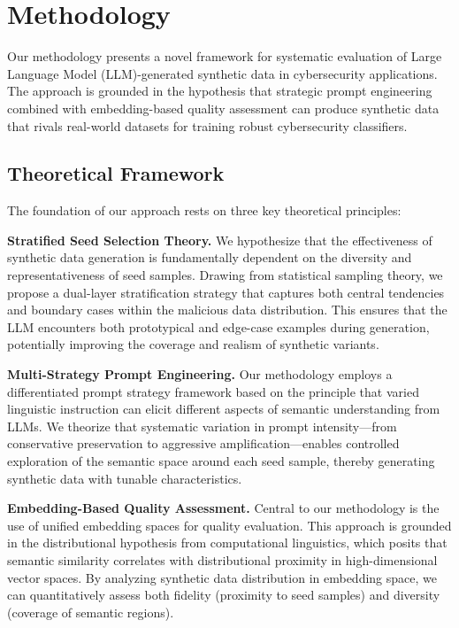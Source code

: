 \section{Methodology}

Our methodology presents a novel framework for systematic evaluation of Large Language Model (LLM)-generated synthetic data in cybersecurity applications. The approach is grounded in the hypothesis that strategic prompt engineering combined with embedding-based quality assessment can produce synthetic data that rivals real-world datasets for training robust cybersecurity classifiers.

\subsection{Theoretical Framework}

The foundation of our approach rests on three key theoretical principles:

\textbf{Stratified Seed Selection Theory.} We hypothesize that the effectiveness of synthetic data generation is fundamentally dependent on the diversity and representativeness of seed samples. Drawing from statistical sampling theory, we propose a dual-layer stratification strategy that captures both central tendencies and boundary cases within the malicious data distribution. This ensures that the LLM encounters both prototypical and edge-case examples during generation, potentially improving the coverage and realism of synthetic variants.

\textbf{Multi-Strategy Prompt Engineering.} Our methodology employs a differentiated prompt strategy framework based on the principle that varied linguistic instruction can elicit different aspects of semantic understanding from LLMs. We theorize that systematic variation in prompt intensity---from conservative preservation to aggressive amplification---enables controlled exploration of the semantic space around each seed sample, thereby generating synthetic data with tunable characteristics.

\textbf{Embedding-Based Quality Assessment.} Central to our methodology is the use of unified embedding spaces for quality evaluation. This approach is grounded in the distributional hypothesis from computational linguistics, which posits that semantic similarity correlates with distributional proximity in high-dimensional vector spaces. By analyzing synthetic data distribution in embedding space, we can quantitatively assess both fidelity (proximity to seed samples) and diversity (coverage of semantic regions).

